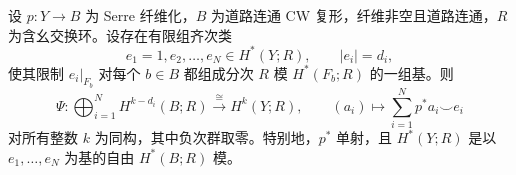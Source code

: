 \begin{theorem}\label{g2:thm:leray-hirsch}
	设 \(p:Y\to B\) 为 Serre 纤维化，\(B\) 为道路连通 CW 复形，纤维非空且道路连通，\(R\) 为含幺交换环。设存在有限组齐次类
	\[
		e_1=1,e_2,\ldots,e_N\in H^*(Y;R),\qquad |e_i|=d_i,
	\]
	使其限制 \(e_i|_{F_b}\) 对每个 \(b\in B\) 都组成分次 \(R\) 模 \(H^*(F_b;R)\) 的一组基。则
	\begin{equation}\label{g2:eq:leray-hirsch-map}
		\Psi:\bigoplus_{i=1}^N H^{k-d_i}(B;R)\xrightarrow{\ \cong\ }H^k(Y;R),
		\qquad(a_i)\longmapsto\sum_{i=1}^N p^*a_i\smile e_i
	\end{equation}
	对所有整数 \(k\) 为同构，其中负次群取零。特别地，\(p^*\) 单射，且 \(H^*(Y;R)\) 是以 \(e_1,\ldots,e_N\) 为基的自由 \(H^*(B;R)\) 模。
\end{theorem}
